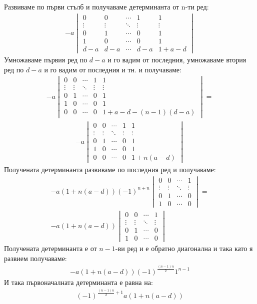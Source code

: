\documentclass[a4paper, 12pt, oneside]{article}
\begin{document}
Развиваме по първи стълб и получаваме детерминанта от n-ти ред:
\begin{align*}
-a\begin{vmatrix}
    0 & 0 & \cdots & 1 & 1 \\
    \vdots & \vdots & \ddots & \vdots & \vdots \\
    0 & 1 & \cdots & 0 & 1 \\
    1 & 0 & \cdots & 0 & 1  \\
    d - a & d - a & \cdots & d - a & 1 + a - d
\end{vmatrix}
\end{align*}
Умножаваме първия ред по \(d - a\) и го вадим от последния,
умножаваме втория ред по \(d - a\) и го вадим от последния и тн. и получаваме:
\begin{align*}
-a\begin{vmatrix}
    0 & 0 & \cdots & 1 & 1 \\
    \vdots & \vdots & \ddots & \vdots & \vdots \\
    0 & 1 & \cdots & 0 & 1 \\
    1 & 0 & \cdots & 0 & 1  \\
    0 & 0 & \cdots & 0 & 1 + a - d - (n - 1)(d - a)
\end{vmatrix} =
\end{align*}
\begin{align*}
-a\begin{vmatrix}
    0 & 0 & \cdots & 1 & 1 \\
    \vdots & \vdots & \ddots & \vdots & \vdots \\
    0 & 1 & \cdots & 0 & 1 \\
    1 & 0 & \cdots & 0 & 1  \\
    0 & 0 & \cdots & 0 & 1 + n(a - d)
\end{vmatrix}
\end{align*}
Получената детерминанта развиваме по последния ред и получаваме:
\begin{align*}
-a(1 + n(a - d))(-1)^{n + n}\begin{vmatrix}
    0 & 0 & \cdots & 1  \\
    \vdots & \vdots & \ddots & \vdots \\
    0 & 1 & \cdots & 0  \\
    1 & 0 & \cdots & 0
\end{vmatrix} = \\
-a(1 + n(a - d))\begin{vmatrix}
    0 & 0 & \cdots & 1  \\
    \vdots & \vdots & \ddots & \vdots \\
    0 & 1 & \cdots & 0  \\
    1 & 0 & \cdots & 0
\end{vmatrix}
\end{align*}
Получената детерминанта е от \(n - 1\)-ви ред и е обратно диагонална и така като я развием получаваме:
\begin{align*}
-a(1 + n(a - d))(-1)^{\displaystyle\frac{(n - 1)n}{2}}1^{n - 1}
\end{align*}
И така първоначалната детерминанта е равна на:
\begin{align*}
(-1)^{\displaystyle\frac{(n - 1)n}{2} + 1}a(1 + n(a - d))
\end{align*}
\end{document}
